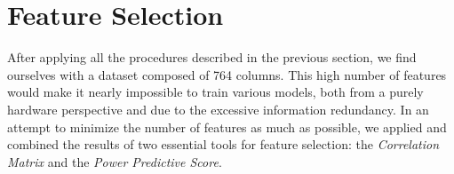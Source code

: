 \newpage
\section{Feature Selection}\label{sec:featureselection}
After applying all the procedures described in the previous section,
we find ourselves with a dataset composed of 764 columns.
This high number of features would make it nearly impossible to train various models,
both from a purely hardware perspective and due to the excessive information redundancy.
In an attempt to minimize the number of features as much as possible,
we applied and combined the results of two essential tools for feature selection:
the \textit{Correlation Matrix}\cite{corr} and the \textit{Power Predictive Score}\cite{pps}.


